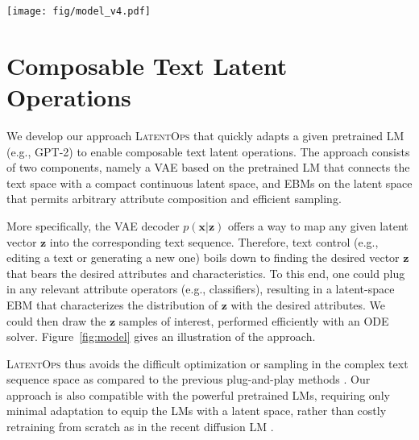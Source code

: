\documentclass[11pt]{article}
\begin{document}
 \begin{figure*}
    \centering
    \vspace{-15pt}
    \texttt{[image: fig/model\_v4.pdf]}
\caption{Overview of \textsc{LatentOps}. 
    (Left): We equip pretrained LMs (e.g., GPT-2) with the compact continuous latent space through parameter-efficient adaptation (\S\ref{sec:vae_training}).
    (Right): One could plug in arbitrary operators (e.g., attribute classifiers) to obtain the latent-space EBM (\S\ref{sec:latent_ebms}). We then sample desired latent vectors efficiently by solving the ODE which works backwards through the diffusion process from time $t=T$ to $0$. The resulting sample $\bm{z}(0)$ is fed to the decoder (adapted GPT-2) to generate the desired text sequence.
    }
    \label{fig:model}
    \vspace{-10pt}
\end{figure*}

\section{Composable Text Latent Operations} 
We develop our approach \textsc{LatentOps} that quickly adapts a given pretrained LM (e.g., GPT-2) to enable composable text latent operations. The approach consists of two components, namely a VAE based on the pretrained LM that connects the text space with a compact continuous latent space, and EBMs on the latent space that permits arbitrary attribute composition and efficient sampling. 

More specifically, the VAE decoder $p(\bm{x} | \bm{z})$ offers a way to map any given latent vector $\bm{z}$ into the corresponding text sequence. Therefore, text control (e.g., editing a text or generating a new one) boils down to finding the desired vector $\bm{z}$ that bears the desired attributes and characteristics. To this end, one could plug in any relevant attribute operators (e.g., classifiers), resulting in a latent-space EBM that characterizes the distribution of $\bm{z}$ with the desired attributes. We could then draw the $\bm{z}$ samples of interest, performed efficiently with an ODE solver. Figure~\ref{fig:model} gives an illustration of the approach.

\textsc{LatentOps} thus avoids the difficult optimization or sampling in the complex text sequence space as compared to the previous plug-and-play methods \cite[e.g.,][]{DBLP:journals/corr/abs-2104-05218,Dathathri2020Plug,QinCOLD}. Our approach is also compatible with the powerful pretrained LMs, requiring only minimal adaptation to equip the LMs with a latent space, rather than costly retraining from scratch as in the recent diffusion LM \cite{li2022diffusion}. 
\end{document}
